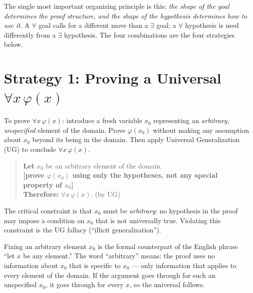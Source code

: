 \begin{exposition}
The single most important organizing principle is this: \emph{the shape of the
goal determines the proof structure, and the shape of the hypothesis determines
how to use it}. A $\forall$ goal calls for a different move than a $\exists$
goal; a $\forall$ hypothesis is used differently from a $\exists$ hypothesis.
The four combinations are the four strategies below.
\end{exposition}


\section*{Strategy 1: Proving a Universal $\forall x\,\varphi(x)$}

\begin{exposition}
To prove $\forall x\,\varphi(x)$: introduce a fresh variable $x_0$ representing
an \emph{arbitrary, unspecified} element of the domain. Prove $\varphi(x_0)$
without making any assumption about $x_0$ beyond its being in the domain. Then
apply Universal Generalization (UG) to conclude $\forall x\,\varphi(x)$.
\end{exposition}

\begin{quote}
\textbf{Let} $x_0$ be an arbitrary element of the domain.\\
\textbf{[prove $\varphi(x_0)$ using only the hypotheses, not any special property of $x_0$]}\\
\textbf{Therefore:} $\forall x\,\varphi(x)$. \quad (by UG)
\end{quote}

\begin{exposition}
The critical constraint is that $x_0$ must be \emph{arbitrary}: no hypothesis
in the proof may impose a condition on $x_0$ that is not universally true.
Violating this constraint is the UG fallacy (``illicit generalization'').
\end{exposition}

\begin{remark*}
Fixing an arbitrary element $x_0$ is the formal counterpart of the English
phrase ``let $x$ be any element.'' The word ``arbitrary'' means: the proof
uses no information about $x_0$ that is specific to $x_0$ --- only information
that applies to every element of the domain. If the argument goes through for
such an unspecified $x_0$, it goes through for every $x$, so the universal
follows.
\end{remark*}

